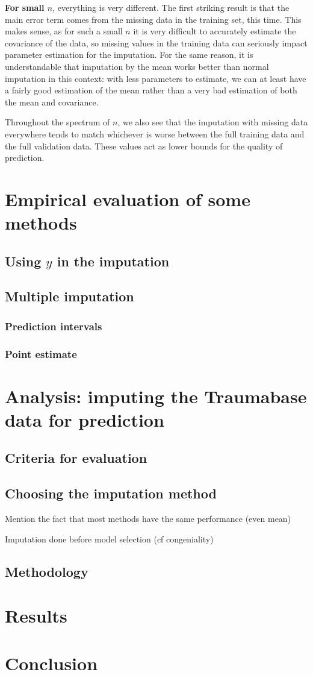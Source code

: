 \documentclass[12pt, a4paper]{memoir}
\begin{document}
\textbf{For small $n$}, everything is very different. The first striking result is that the main error term comes from the missing data in the training set, this time. This makes sense, as for such a small $n$ it is very difficult to accurately estimate the covariance of the data, so missing values in the training data can seriously impact parameter estimation for the imputation. For the same reason, it is understandable that imputation by the mean works better than normal imputation in this context: with less parameters to estimate, we can at least have a fairly good estimation of the mean rather than a very bad estimation of both the mean and covariance. 

Throughout the spectrum of $n$, we also see that the imputation with missing data everywhere tends to match whichever is worse between the full training data and the full validation data. These values act as lower bounds for the quality of prediction. 

\chapter{Empirical evaluation of some methods}
	\section{Using $y$ in the imputation}
	\section{Multiple imputation}
		\subsection{Prediction intervals}
		\subsection{Point estimate}

\chapter{Analysis: imputing the Traumabase data for prediction}
\label{analysis}
	\section{Criteria for evaluation}
	\section{Choosing the imputation method}
		Mention the fact that most methods have the same performance (even mean)
		
		Imputation done before model selection (cf congeniality)
	\section{Methodology}
	
\chapter{Results}
\label{results}

\chapter*{Conclusion}


\end{document}

